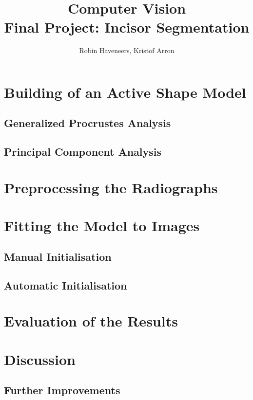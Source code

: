 \documentclass[]{article}
\title{Computer Vision\\  \large Final Project: Incisor Segmentation}
\author{Robin Haveneers, Kristof Arron}
\begin{document}
\maketitle

\tableofcontents

\section{Building of an Active Shape Model}

\subsection{Generalized Procrustes Analysis}

\subsection{Principal Component Analysis}


\section{Preprocessing the Radiographs}


\section{Fitting the Model to Images}

\subsection{Manual Initialisation}

\subsection{Automatic Initialisation}


\section{Evaluation of the Results}


\section{Discussion}

\subsection{Further Improvements}

\end{document}

